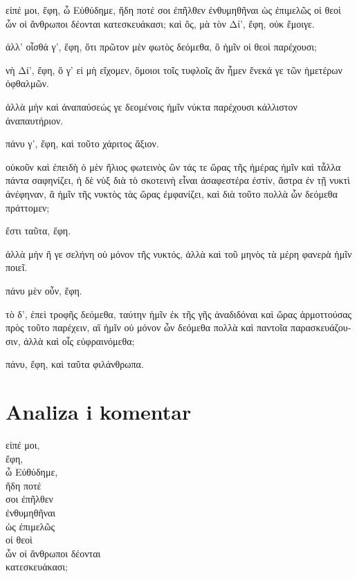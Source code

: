 {\large

\begin{greek}

\noindent εἰπέ μοι, ἔφη, ὦ Εὐθύδημε, ἤδη ποτέ σοι ἐπῆλθεν ἐνθυμηθῆναι ὡς ἐπιμελῶς οἱ θεοὶ ὧν οἱ ἄνθρωποι δέονται κατεσκευάκασι; καὶ ὅς, μὰ τὸν Δί', ἔφη, οὐκ ἔμοιγε. 

ἀλλ' οἶσθά γ', ἔφη, ὅτι πρῶτον μὲν φωτὸς δεόμεθα, ὃ ἡμῖν οἱ θεοὶ παρέχουσι; 

νὴ Δί', ἔφη, ὅ γ' εἰ μὴ εἴχομεν, ὅμοιοι τοῖς τυφλοῖς ἂν ἦμεν ἕνεκά γε τῶν ἡμετέρων ὀφθαλμῶν. 

ἀλλὰ μὴν καὶ ἀναπαύσεώς γε δεομένοις ἡμῖν νύκτα παρέχουσι κάλλιστον ἀναπαυτήριον.

πάνυ γ', ἔφη, καὶ τοῦτο χάριτος ἄξιον. 

οὐκοῦν καὶ ἐπειδὴ ὁ μὲν ἥλιος φωτεινὸς ὢν τάς τε ὥρας τῆς ἡμέρας ἡμῖν καὶ τἆλλα πάντα σαφηνίζει, ἡ δὲ νὺξ διὰ τὸ σκοτεινὴ εἶναι ἀσαφεστέρα ἐστίν, ἄστρα ἐν τῇ νυκτὶ ἀνέφηναν, ἃ ἡμῖν τῆς νυκτὸς τὰς ὥρας ἐμφανίζει, καὶ διὰ τοῦτο πολλὰ ὧν δεόμεθα πράττομεν; 

ἔστι ταῦτα, ἔφη. 

ἀλλὰ μὴν ἥ γε σελήνη οὐ μόνον τῆς νυκτός, ἀλλὰ καὶ τοῦ μηνὸς τὰ μέρη φανερὰ ἡμῖν ποιεῖ.

πάνυ μὲν οὖν, ἔφη. 

τὸ δ', ἐπεὶ τροφῆς δεόμεθα, ταύτην ἡμῖν ἐκ τῆς γῆς ἀναδιδόναι καὶ ὥρας ἁρμοττούσας πρὸς τοῦτο παρέχειν, αἳ ἡμῖν οὐ μόνον ὧν δεόμεθα πολλὰ καὶ παντοῖα παρασκευάζουσιν, ἀλλὰ καὶ οἷς εὐφραινόμεθα;

πάνυ, ἔφη, καὶ ταῦτα φιλάνθρωπα.

\end{greek}

}


\section*{Analiza i komentar}



{\large
\begin{greek}
\noindent εἰπέ μοι, \\
\tabto{2em} ἔφη, \\
ὦ Εὐθύδημε, \\
ἤδη ποτέ \\
\tabto{2em} σοι ἐπῆλθεν \\
\tabto{4em} ἐνθυμηθῆναι \\
\tabto{6em} ὡς ἐπιμελῶς \\
\tabto{6em} οἱ θεοὶ \\
\tabto{8em} ὧν οἱ ἄνθρωποι δέονται \\
\tabto{6em} κατεσκευάκασι;\\

\end{greek}
}

